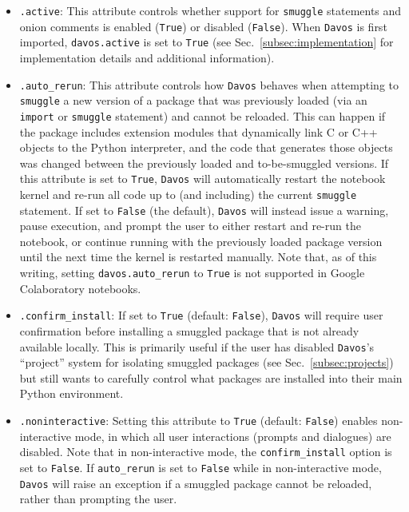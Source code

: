 \documentclass[preprint,12pt,a4paper]{elsarticle}
\begin{document}
\begin{itemize}
\item \texttt{.active}: This attribute controls whether support for \texttt{smuggle}
  statements and onion comments is enabled (\texttt{True}) or
  disabled (\texttt{False}). When \texttt{Davos} is first imported,
  \texttt{davos.active} is set to \texttt{True} (see Sec.~\ref{subsec:implementation} for implementation details and additional information).

\item \texttt{.auto\_rerun}: This attribute controls how
  \texttt{Davos} behaves when attempting to \texttt{smuggle} a new
  version of a package that was previously loaded (via an \texttt{import} or \texttt{smuggle} statement) and cannot be
  reloaded. This can happen if the package includes extension modules
  that dynamically link C or C++ objects to the Python interpreter,
  and the code that generates those objects was changed between the
  previously loaded and to-be-smuggled versions. If this attribute
  is set to \texttt{True}, \texttt{Davos} will automatically restart
  the notebook kernel and re-run all code up to (and including) the
  current \texttt{smuggle} statement. If set to \texttt{False} (the default),
  \texttt{Davos} will instead issue a warning, pause execution, and
  prompt the user to either restart and re-run the notebook, or
  continue running with the previously loaded package version until
  the next time the kernel is restarted manually. Note that, as of
  this writing, setting \texttt{davos.auto\_rerun} to \texttt{True} is not
  supported in Google Colaboratory notebooks.

\item \texttt{.confirm\_install}: If set to \texttt{True} (default:
  \texttt{False}), \texttt{Davos} will require user confirmation
  before installing a smuggled package that is not already
  available locally. This is primarily useful if the user has disabled
  \texttt{Davos}'s ``project'' system for isolating smuggled packages (see
  Sec.~\ref{subsec:projects}) but still wants to carefully control what
  packages are installed into their main Python environment.

\item \texttt{.noninteractive}: Setting this attribute to
  \texttt{True} (default: \texttt{False}) enables non-in\-ter\-act\-ive
  mode, in which all user interactions (prompts and dialogues) are
  disabled. Note that in non-interactive mode, the
  \texttt{confirm\_install} option is set to \texttt{False}. If
  \texttt{auto\_rerun} is set to \texttt{False} while in non-interactive
  mode, \texttt{Davos} will raise an exception if a smuggled package
  cannot be reloaded, rather than prompting the user.


\end{itemize}
\end{document}

